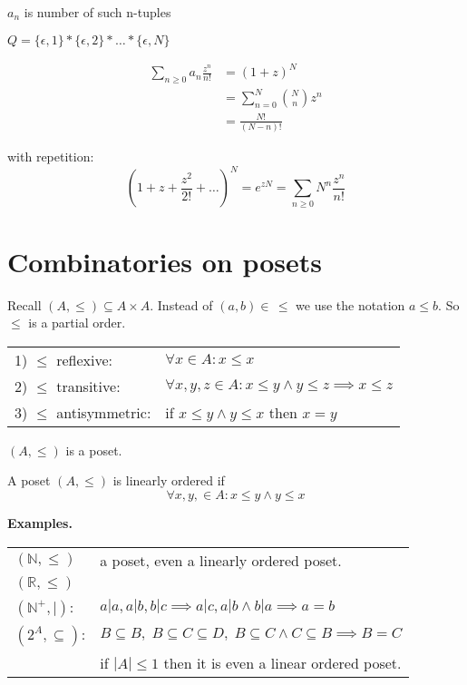 $a_n$ is number of such n-tuples

$Q = \{\epsilon,1\} * \{\epsilon,2\} * \ldots * \{\epsilon,N\} $

\begin{align*}
  \sum_{n\geq 0} a_n \frac{z^n}{n!} &= 
    (1+z)^N \\
    &= \sum_{n=0} ^{N} {N \choose n} z^n \\
    &= \frac{N!}{(N-n)!} 
\end{align*}

with repetition: 
\[
  (1+z+ \frac{z^2}{2!} + \ldots)^N 
    = e^{zN} = \sum_{n\geq 0} N^n \frac{z^n}{n!}
\]

\section{Combinatories on posets}

Recall $(A, \leq) \subseteq A \times A$. 
Instead of $(a,b) \in \, \leq$ we use the notation $a \leq b$. So $\leq$ is a partial order.

\begin{tabular}{ll}
  1) $\leq$ reflexive: &
    $\forall x \in A: x \leq x$ \\
  2) $\leq$ transitive:  &
    $\forall x,y,z \in A: x \leq y \land y \leq z \implies x \leq z$ \\
  3) $\leq$ antisymmetric: &
    if $x \leq y \land y \leq x$ then $x = y$ \\
\end{tabular}

$(A,\leq)$ is a poset.

A poset $(A,\leq)$ is linearly ordered if 
\[
  \forall x,y, \in A: x \leq y \land y \leq x
\]

\textbf{Examples.} \\
\begin{tabular}{l l}
  $(\mathbb{N}, \leq)$ & a poset, even a linearly ordered poset. \\
  $(\mathbb{R}, \leq)$ \\
  $(\mathbb{N}^{+}, |)$: 
    & $a|a, a|b, b|c \implies a|c, a|b \land b|a \implies a = b$\\
  $(2^A, \subseteq)$: 
    & $ B \subseteq B,\; B \subseteq C \subseteq D,\; B\subseteq C \land C \subseteq B \implies B = C$ \\
    & if $|A|\leq 1$ then it is even a linear ordered poset. 
\end{tabular}

